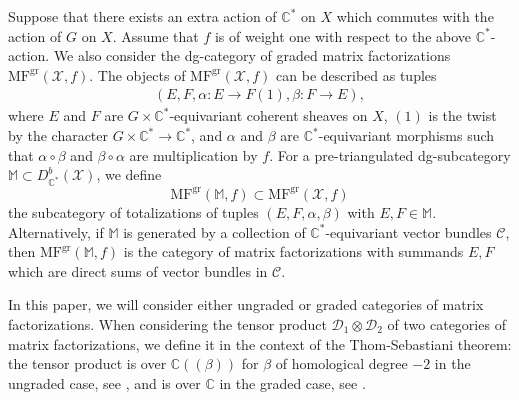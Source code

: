 \documentclass [11pt,oneside,a4paper,mathscr]{amsart}
\theoremstyle{definition}
\newcommand{\X}{\mathscr{X}}
\begin{document}
Suppose that there exists an extra action of $\mathbb{C}^*$ on $X$ which commutes with the action of $G$ on $X$.
Assume that $f$ is of weight one with respect to 
the above $\mathbb{C}^{\ast}$-action. 
We also consider the dg-category of graded matrix factorizations $\mathrm{MF}^{\mathrm{gr}}(\mathscr{X}, f)$. 
The objects of $\mathrm{MF}^{\mathrm{gr}}(\mathscr{X}, f)$ can be described as tuples 
\begin{align}\label{tuplet:graded}
(E, F, \alpha \colon 
E\to F(1), \beta \colon F\to E),
\end{align}
where $E$ and $F$ are $G\times\mathbb{C}^{\ast}$-equivariant coherent sheaves
on $X$, $(1)$ is the twist by the character 
$G \times \mathbb{C}^{\ast} \to \mathbb{C}^{\ast}$, 
and $\alpha$ and $\beta$ are $\mathbb{C}^{\ast}$-equivariant morphisms
such that $\alpha\circ\beta$ and $\beta\circ\alpha$ are multiplication by $f$.
For a pre-triangulated dg-subcategory $\mathbb{M}\subset D^b_{\mathbb{C}^*}(\X)$, we define 
\[\mathrm{MF}^{\mathrm{gr}}(\mathbb{M}, f)\subset \mathrm{MF}^{\mathrm{gr}}(\X, f)\] 
the subcategory of totalizations of tuples $(E, F, \alpha, \beta)$ with $E, F \in \mathbb{M}$. 
Alternatively, if $\mathbb{M}$ is generated by a collection of $\mathbb{C}^*$-equivariant vector bundles $\mathscr{C}$, then 
$\mathrm{MF}^{\mathrm{gr}}(\mathbb{M}, f)$ is the category of matrix factorizations with summands $E, F$ which are direct sums of vector bundles in $\mathscr{C}$.

In this paper, we will consider either ungraded or 
graded categories of matrix factorizations. 
When considering the tensor product $\mathcal{D}_1 \otimes \mathcal{D}_2$ of two categories of matrix factorizations, 
we define it in the context of the Thom-Sebastiani theorem:
the tensor product is over $\mathbb{C}(\!(\beta)\!)$ for $\beta$ of homological degree $-2$ in the ungraded case, see \cite[Theorem 4.1.3]{Preygel}, and is over $\mathbb{C}$ in the graded case, see \cite[Corollary 5.18]{MR3270588}. 
\end{document}
